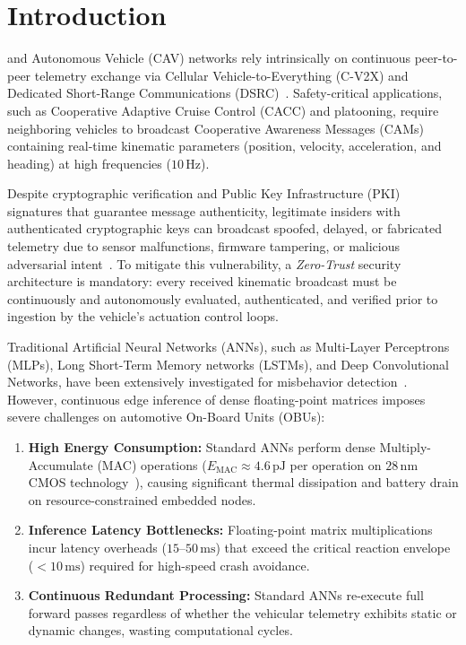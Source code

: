\documentclass[journal,compsoc]{IEEEtran}
\begin{document}
\maketitle
\IEEEdisplaynontitleabstractindextext
\IEEEpeerreviewmaketitle

\section{Introduction}
 and Autonomous Vehicle (CAV) networks rely intrinsically on continuous peer-to-peer telemetry exchange via Cellular Vehicle-to-Everything (C-V2X) and Dedicated Short-Range Communications (DSRC)~\cite{vanderheijden2018veremi}. Safety-critical applications, such as Cooperative Adaptive Cruise Control (CACC) and platooning, require neighboring vehicles to broadcast Cooperative Awareness Messages (CAMs) containing real-time kinematic parameters (position, velocity, acceleration, and heading) at high frequencies ($10\,\text{Hz}$). 

Despite cryptographic verification and Public Key Infrastructure (PKI) signatures that guarantee message authenticity, legitimate insiders with authenticated cryptographic keys can broadcast spoofed, delayed, or fabricated telemetry due to sensor malfunctions, firmware tampering, or malicious adversarial intent~\cite{grover2022machine,sharma2023collaborative}. To mitigate this vulnerability, a \textit{Zero-Trust} security architecture is mandatory: every received kinematic broadcast must be continuously and autonomously evaluated, authenticated, and verified prior to ingestion by the vehicle's actuation control loops.

Traditional Artificial Neural Networks (ANNs), such as Multi-Layer Perceptrons (MLPs), Long Short-Term Memory networks (LSTMs), and Deep Convolutional Networks, have been extensively investigated for misbehavior detection~\cite{alladi2020deep}. However, continuous edge inference of dense floating-point matrices imposes severe challenges on automotive On-Board Units (OBUs):
\begin{enumerate}
    \item \textbf{High Energy Consumption:} Standard ANNs perform dense Multiply-Accumulate (MAC) operations ($E_{\text{MAC}} \approx 4.6\,\text{pJ}$ per operation on $28\,\text{nm}$ CMOS technology~\cite{horowitz20141}), causing significant thermal dissipation and battery drain on resource-constrained embedded nodes.
    \item \textbf{Inference Latency Bottlenecks:} Floating-point matrix multiplications incur latency overheads ($15\text{--}50\,\text{ms}$) that exceed the critical reaction envelope ($<10\,\text{ms}$) required for high-speed crash avoidance.
    \item \textbf{Continuous Redundant Processing:} Standard ANNs re-execute full forward passes regardless of whether the vehicular telemetry exhibits static or dynamic changes, wasting computational cycles.
\end{enumerate}
\end{document}
